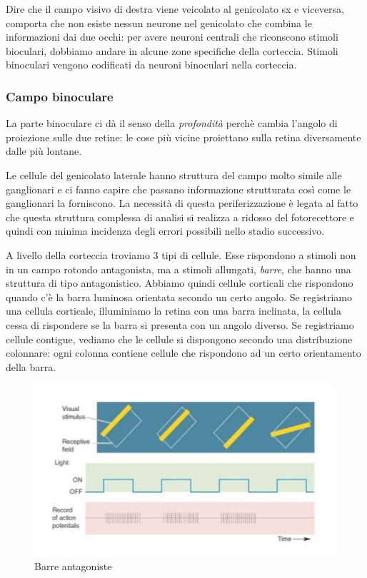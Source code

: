 \documentclass[a4paper,12pt]{article}
\begin{document}
Dire che il campo visivo di destra viene veicolato al genicolato sx e viceversa, comporta che non esiste nessun neurone nel genicolato che combina le informazioni dai due occhi: per avere neuroni centrali che riconscono stimoli bioculari, dobbiamo andare in alcune zone specifiche della corteccia. Stimoli binoculari vengono codificati da neuroni binoculari nella corteccia. 

\subsubsection{Campo binoculare}
La parte binoculare ci dà il senso della \emph{profondità} perchè cambia l'angolo di proiezione sulle due retine: le cose più vicine proiettano sulla retina diversamente dalle più lontane. 

Le cellule del genicolato laterale hanno struttura del campo molto simile alle ganglionari e ci fanno capire che passano informazione strutturata così come le ganglionari la forniscono. La necessità di questa periferizzazione è legata al fatto che questa struttura complessa di analisi si realizza a ridosso del fotorecettore e quindi con minima incidenza degli errori possibili nello stadio successivo. 

A livello della corteccia troviamo 3 tipi di cellule. Esse rispondono a stimoli non in un campo rotondo antagonista, ma a stimoli allungati, \emph{barre}, che hanno una struttura di tipo antagonistico. Abbiamo quindi cellule corticali che rispondono quando c'è la barra luminosa orientata secondo un certo angolo.  Se registriamo una cellula corticale, illuminiamo la retina con una barra inclinata, la cellula cessa di rispondere se la barra si presenta con un angolo diverso. Se registriamo cellule contigue, vediamo che le cellule si dispongono secondo una distribuzione colonnare: ogni colonna contiene cellule che rispondono ad un certo orientamento della barra. 

\begin{figure}[H]
\centering
\includegraphics[scale=0.6]{immagine/barre.jpg}
\caption{Barre antagoniste}
\end{figure} 
\end{document}
